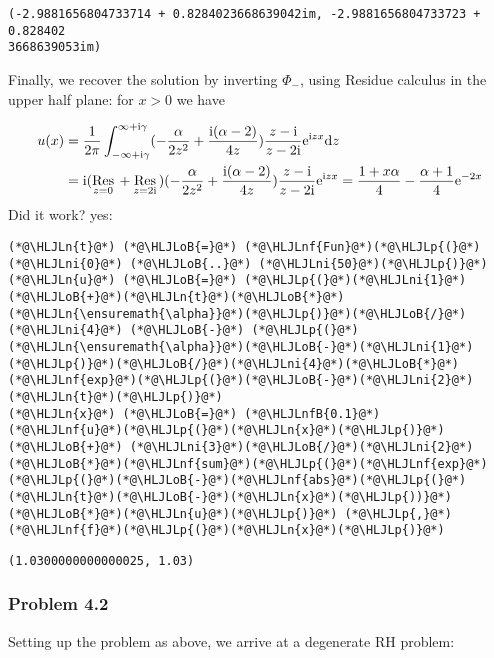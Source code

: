 \documentclass[12pt,landscape]{article}
\newcommand{\HLJLn}[1]{#1}
\newcommand{\HLJLnf}[1]{\textcolor[RGB]{66,102,213}{#1}}
\newcommand{\HLJLnfB}[1]{\textcolor[RGB]{59,151,46}{#1}}
\newcommand{\HLJLni}[1]{\textcolor[RGB]{59,151,46}{#1}}
\newcommand{\HLJLoB}[1]{\textcolor[RGB]{102,102,102}{\textbf{#1}}}
\newcommand{\HLJLp}[1]{#1}
\def\D{ {\rm d} }
\def\I{ {\rm i} }
\def\E{ {\rm e} }
\def\Res_#1{\underset{#1}{\rm Res}\,}
\def\dz{\D z}
\begin{document}
{\begin{lstlisting}
(-2.9881656804733714 + 0.8284023668639042im, -2.9881656804733723 + 0.828402
3668639053im)
\end{lstlisting}


Finally, we recover the solution by inverting $\Phi_-$, using Residue calculus in the upper half plane: for $x > 0$ we have


\begin{align*}
u(x) &= {1 \over 2 \pi} \int_{-\infty+ \I \gamma}^{\infty + \I \gamma} (-{\alpha \over 2 z^2}+{\I (\alpha-2) \over 4 z}  ) {z - \I  \over z - 2\I}  \E^{\I z x}  \dz \\
&= \I (\Res_{z = 0} + \Res_{z = 2\I}) (-{\alpha \over 2 z^2}+{\I (\alpha-2) \over 4 z}  ) {z - \I  \over z - 2\I}  \E^{\I z x} = {1+x \alpha \over 4} - {\alpha+1 \over 4} \E^{-2 x}
\end{align*}
Did it work? yes:


\begin{lstlisting}
(*@\HLJLn{t}@*) (*@\HLJLoB{=}@*) (*@\HLJLnf{Fun}@*)(*@\HLJLp{(}@*)(*@\HLJLni{0}@*) (*@\HLJLoB{..}@*) (*@\HLJLni{50}@*)(*@\HLJLp{)}@*)
(*@\HLJLn{u}@*) (*@\HLJLoB{=}@*) (*@\HLJLp{(}@*)(*@\HLJLni{1}@*)(*@\HLJLoB{+}@*)(*@\HLJLn{t}@*)(*@\HLJLoB{*}@*)(*@\HLJLn{\ensuremath{\alpha}}@*)(*@\HLJLp{)}@*)(*@\HLJLoB{/}@*)(*@\HLJLni{4}@*) (*@\HLJLoB{-}@*) (*@\HLJLp{(}@*)(*@\HLJLn{\ensuremath{\alpha}}@*)(*@\HLJLoB{-}@*)(*@\HLJLni{1}@*)(*@\HLJLp{)}@*)(*@\HLJLoB{/}@*)(*@\HLJLni{4}@*)(*@\HLJLoB{*}@*)(*@\HLJLnf{exp}@*)(*@\HLJLp{(}@*)(*@\HLJLoB{-}@*)(*@\HLJLni{2}@*)(*@\HLJLn{t}@*)(*@\HLJLp{)}@*)
(*@\HLJLn{x}@*) (*@\HLJLoB{=}@*) (*@\HLJLnfB{0.1}@*)
(*@\HLJLnf{u}@*)(*@\HLJLp{(}@*)(*@\HLJLn{x}@*)(*@\HLJLp{)}@*) (*@\HLJLoB{+}@*) (*@\HLJLni{3}@*)(*@\HLJLoB{/}@*)(*@\HLJLni{2}@*)(*@\HLJLoB{*}@*)(*@\HLJLnf{sum}@*)(*@\HLJLp{(}@*)(*@\HLJLnf{exp}@*)(*@\HLJLp{(}@*)(*@\HLJLoB{-}@*)(*@\HLJLnf{abs}@*)(*@\HLJLp{(}@*)(*@\HLJLn{t}@*)(*@\HLJLoB{-}@*)(*@\HLJLn{x}@*)(*@\HLJLp{))}@*)(*@\HLJLoB{*}@*)(*@\HLJLn{u}@*)(*@\HLJLp{)}@*) (*@\HLJLp{,}@*) (*@\HLJLnf{f}@*)(*@\HLJLp{(}@*)(*@\HLJLn{x}@*)(*@\HLJLp{)}@*)
\end{lstlisting}

\begin{lstlisting}
(1.0300000000000025, 1.03)
\end{lstlisting}


\subsubsection{Problem 4.2}
Setting up the problem as above, we arrive at a degenerate RH problem:

}
\end{document}
